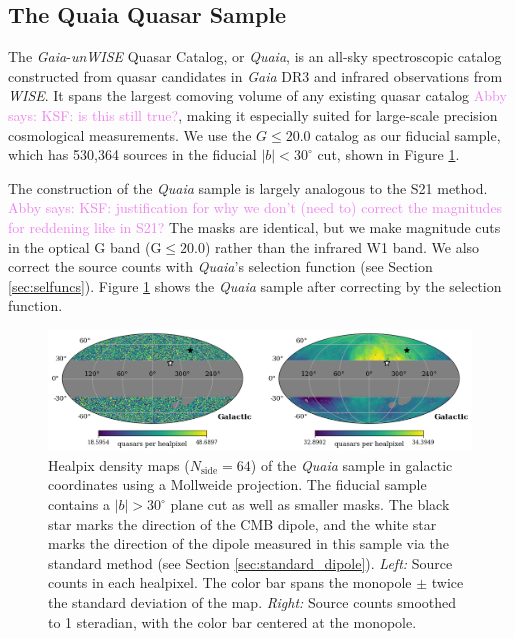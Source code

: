 \documentclass[modern]{aastex631}
\newcommand{\abby}[1]{\textcolor{violet}{Abby says: #1}}
\newcommand{\quaia}{\textsl{Quaia}\xspace}
\newcommand{\gaia}{\textsl{Gaia}\xspace}
\newcommand{\wise}{\textsl{WISE}\xspace}
\newcommand{\unwise}{\textsl{unWISE}\xspace}
\newcommand{\nside}{N_\mathrm{side}}
\begin{document}
\subsection{The Quaia Quasar Sample}
\label{sec:quaia}
The \gaia-\unwise Quasar Catalog, or \quaia, is an all-sky spectroscopic catalog constructed from quasar candidates in \gaia DR3 and infrared observations from \wise \citep{storey-fisher_quaia_2023}.
It spans the largest comoving volume of any existing quasar catalog \abby{KSF: is this still true?}, making it especially suited for large-scale precision cosmological measurements.
We use the $G\leq 20.0$ catalog as our fiducial sample, which has 530,364 sources in the fiducial $|b|<30^\circ$ cut, shown in Figure \ref{fig:quaia_map}.

The construction of the \quaia sample is largely analogous to the S21 method.
\abby{KSF: justification for why we don't (need to) correct the magnitudes for reddening like in S21?}
The masks are identical, but we make magnitude cuts in the optical G band ($\mathrm{G}\leq 20.0$) rather than the infrared W1 band.
We also correct the source counts with \quaia's selection function (see Section \ref{sec:selfuncs}).
Figure \ref{fig:quaia_map} shows the \quaia sample after correcting by the selection function.

\begin{figure}
    \centering
    \includegraphics[width=\textwidth]{images/quaia_map.png}
    \caption{Healpix density maps ($\nside=64$) of the \quaia sample in galactic coordinates using a Mollweide projection. The fiducial sample contains a $|b|>30^\circ$ plane cut as well as smaller masks. The black star marks the direction of the CMB dipole, and the white star marks the direction of the dipole measured in this sample via the standard method (see Section \ref{sec:standard_dipole}). \textit{Left:} Source counts in each healpixel. The color bar spans the monopole $\pm$ twice the standard deviation of the map. \textit{Right:} Source counts smoothed to 1 steradian, with the color bar centered at the monopole.}
    \label{fig:quaia_map}
\end{figure}
\end{document}
